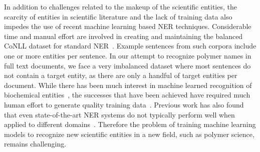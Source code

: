 
In addition to challenges related to the makeup of the scientific entities, the scarcity of entities in scientific literature and the lack of training data also impedes the use of recent machine learning based NER techniques.
Considerable time and manual effort are involved in creating and maintaining the balanced
CoNLL dataset for standard NER~\cite{tjong2003introduction}.
Example sentences from such corpora include one or more entities per sentence. 
In our attempt to recognize polymer names in full text documents, we face a very imbalanced dataset where most sentences do not contain a target entity, as there are only a handful of target entities per document.
While there has been much interest in machine learned recognition of biochemical entities~\cite{jessop2011oscar4,rocktaschel2012chemspot,leaman2015tmchem,swain2016chemdataextractor}, 
the successes that have been achieved have required much human effort to generate quality training data~\cite{krallinger2015chemdner}.
Previous work has also found that even state-of-the-art NER systems do
not typically perform well when applied to different domains~\cite{krallinger2013overview}. 
Therefore the problem of training machine learning models to recognize new scientific entities in a new field, such as polymer science, remains challenging.



